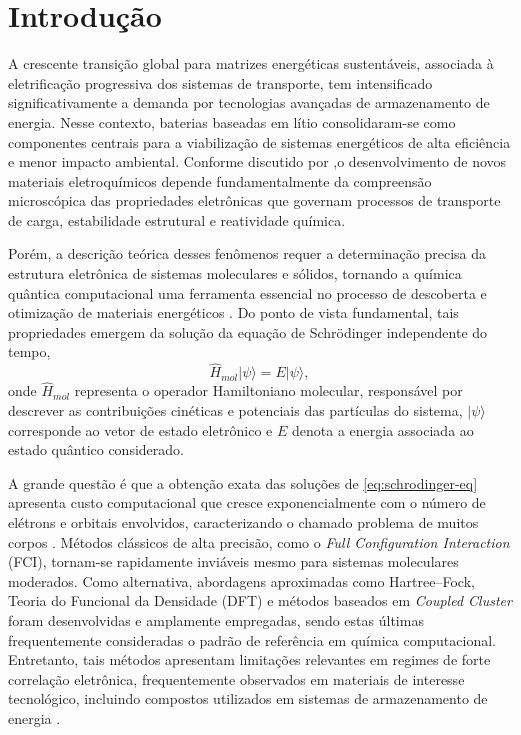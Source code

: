 \section{Introdução}

A crescente transição global para matrizes energéticas sustentáveis,
associada à eletrificação progressiva dos sistemas de transporte,
tem intensificado significativamente a demanda por tecnologias
avançadas de armazenamento de energia.
Nesse contexto, baterias baseadas em lítio consolidaram-se como
componentes centrais para a viabilização de sistemas energéticos
de alta eficiência e menor impacto ambiental. Conforme discutido por 
\textcite{machin2024advancements},o desenvolvimento de novos materiais eletroquímicos depende
fundamentalmente da compreensão microscópica das propriedades
eletrônicas que governam processos de transporte de carga,
estabilidade estrutural e reatividade química.

Porém, a descrição teórica desses fenômenos requer a determinação precisa da
estrutura eletrônica de sistemas moleculares e sólidos, tornando a
química quântica computacional uma ferramenta essencial no processo
de descoberta e otimização de materiais energéticos
\cite{kim2022fault}. Do ponto de vista fundamental, tais propriedades emergem da solução
da equação de Schrödinger independente do tempo,
\begin{equation}
\label{eq:schrodinger-eq}
\hat{H}_{mol}|\psi\rangle = E|\psi\rangle,
\end{equation}
onde $\hat{H}_{mol}$ representa o operador Hamiltoniano molecular,
responsável por descrever as contribuições cinéticas e potenciais
das partículas do sistema, $|\psi\rangle$ corresponde ao vetor de
estado eletrônico e $E$ denota a energia associada ao estado
quântico considerado.

A grande questão é que a obtenção exata das soluções de
\eqref{eq:schrodinger-eq} apresenta custo computacional que cresce
exponencialmente com o número de elétrons e orbitais envolvidos,
caracterizando o chamado problema de muitos corpos
\cite{cao2019quantum}.
Métodos clássicos de alta precisão, como o
\textit{Full Configuration Interaction} (FCI),
tornam-se rapidamente inviáveis mesmo para sistemas moleculares
moderados.
Como alternativa, abordagens aproximadas como Hartree–Fock,
Teoria do Funcional da Densidade (DFT) e métodos baseados em
\textit{Coupled Cluster} foram desenvolvidas e amplamente empregadas,
sendo estas últimas frequentemente consideradas o padrão de
referência em química computacional.
Entretanto, tais métodos apresentam limitações relevantes em regimes
de forte correlação eletrônica, frequentemente observados em
materiais de interesse tecnológico,
incluindo compostos utilizados em sistemas de armazenamento de energia
\cite{farag2022towards,tilly2022variational}.

